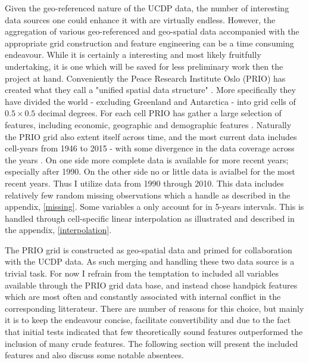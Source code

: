 \documentclass[a4paper]{article}
\begin{document}
Given the geo-referenced nature of the UCDP data, the number of interesting data sources one could enhance it with are virtually endless. However, the aggregation of various geo-referenced and geo-spatial data accompanied with the appropriate grid construction and feature engineering can be a time consuming endeavour. While it is certainly a interesting and most likely fruitfully undertaking, it is one which will be saved for less preliminary work then the project at hand. Conveniently the Peace Research Institute Oslo (PRIO) has created what they call a "unified spatial data structure" \cite[1]{Tollefsen_2012}. More specifically they have divided the world - excluding Greenland and Antarctica - into grid cells of $0.5 \times 0.5$ decimal degrees. For each cell PRIO has gather a large selection of features, including economic, geographic and demographic features \citep{Tollefsen_2012}. Naturally the PRIO grid also extent itself across time, and the most current data includes cell-years from 1946 to 2015 - with some divergence in the data coverage across the years \citep{Tollefsen_2016}. On one side more complete data is available for more recent years; especially after 1990. On the other side no or little data is avialbel for the most recent years. Thus I utilize data from 1990 through 2010. This data includes relatively few random missing observations which a handle as described in the appendix, \autoref{missing}. Some variables a only account for in 5-years intervals. This is handled through cell-specific linear interpolation as illustrated and described in the appendix, \autoref{interpolation}.\par

The PRIO grid is constructed as geo-spatial data and primed for collaboration with the UCDP data. As such merging and handling these two data source is a trivial task. For now I refrain from the temptation to included all variables available through the PRIO grid data base, and instead chose handpick features which are most often and constantly associated with internal conflict in the corresponding litterateur. There are number of reasons for this choice, but mainly it is to keep the endeavour concise, facilitate convertibility and due to the fact that initial tests indicated that few theoretically sound features outperformed the inclusion of many crude features. The following section will present the included features and also discuss some notable absentees.\par
\end{document}
